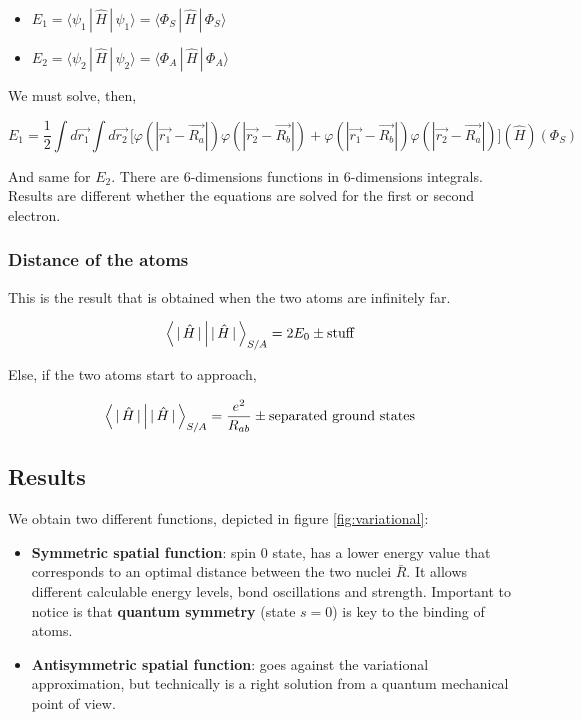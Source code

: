 	\begin{multicols}{2}
		\begin{itemize}
			\item $E_1=\langle{\psi_1\,|\,\hat{H}\,|\,\psi_1}\rangle =\langle{\Phi_S\,|\,\hat{H}\,|\,\Phi_S}\rangle$
			\item $E_2=\langle{\psi_2\,|\,\hat{H}\,|\,\psi_2}\rangle=\langle{\Phi_A\,|\,\hat{H}\,|\,\Phi_A}\rangle$
		\end{itemize}
	\end{multicols}

	We must solve, then,

	$$E_1=\frac{1}{2}\int d\vec{r_1}\int d\vec{r_2}\,\big[\varphi(|\vec{r_1}-\vec{R_a}|)\varphi(|\vec{r_2}-\vec{R_b}|)+\varphi(|\vec{r_1}-\vec{R_b}|)\varphi(|\vec{r_2}-\vec{R_a}|)\big](\hat{H})(\Phi_S)$$

	And same for $E_2$.
	There are 6-dimensions functions in 6-dimensions integrals.
	Results are different whether the equations are solved for the first or second electron.

		\subsubsection{Distance of the atoms}
		This is the result that is obtained when the two atoms are infinitely far.

		$$\braket{\,|\,\hat{H}\,|\,}_{S/A}=2E_0\pm\text{stuff}$$

		Else, if the two atoms start to approach,

		$$\braket{\,|\,\hat{H}\,|\,}_{S/A}=\frac{e^2}{R_{ab}}\pm\text{separated ground states}$$

	\subsection{Results}
	We obtain two different functions, depicted in figure \ref{fig:variational}:

	\begin{multicols}{2}
	\begin{itemize}
		\item \textbf{Symmetric spatial function}: spin $0$ state, has a lower energy value that corresponds to an optimal distance between the two nuclei $\bar{R}$.
	It allows different calculable energy levels, bond oscillations and strength.
	Important to notice is that \textbf{quantum symmetry} (state $s=0$) is key to the binding of atoms.
		\item \textbf{Antisymmetric spatial function}: goes against the variational approximation, but technically is a right solution from a quantum mechanical point of view.
	\end{itemize}
	\end{multicols}

